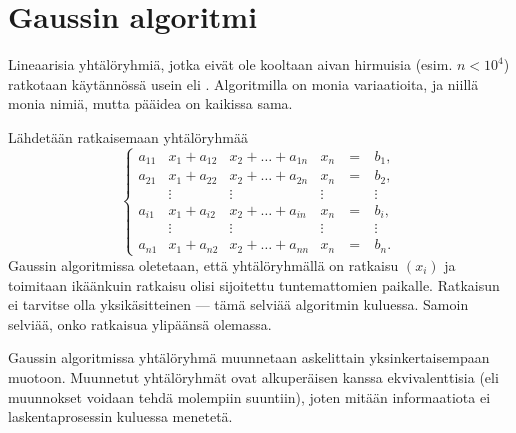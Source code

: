 \section{Gaussin algoritmi} \label{Gaussin algoritmi}
\alku
{}

Lineaarisia yhtälöryhmiä, jotka eivät ole kooltaan aivan hirmuisia (esim. $n<10^4$) ratkotaan
käytännössä usein  eli . Algoritmilla on
monia variaatioita, ja niillä monia nimiä, mutta pääidea on kaikissa sama.

Lähdetään ratkaisemaan yhtälöryhmää
\[
\left\{
\begin{alignedat}{3}
a_{11} &x_1 + a_{12} &x_2 + \ldots + a_{1n}         &x_n  \ &= \ &b_1,    \\
a_{21} &x_1 + a_{22} &x_2 + \ldots + a_{2n}         &x_n  \ &= \ &b_2,    \\
       &\vdots       & \vdots \qquad \qquad \quad \ &\vdots &    &\vdots \\
a_{i1} &x_1 + a_{i2} &x_2 + \ldots + a_{in}         &x_n  \ &= \ &b_i,    \\
       &\vdots       & \vdots \qquad \qquad \quad \ &\vdots &    &\vdots \\
a_{n1} &x_1 + a_{n2} &x_2 + \ldots + a_{nn}         &x_n  \ &= \ &b_n. \
\end{alignedat}
\right.
\]
Gaussin algoritmissa oletetaan, että yhtälöryhmällä on ratkaisu $(x_i)$ ja toimitaan ikäänkuin
ratkaisu olisi sijoitettu tuntemattomien paikalle. Ratkaisun ei tarvitse olla yksikäsitteinen
--- tämä selviää algoritmin kuluessa. Samoin selviää, onko ratkaisua ylipäänsä olemassa.

Gaussin algoritmissa yhtälöryhmä muunnetaan askelittain yksinkertaisempaan muotoon. Muunnetut
yhtälöryhmät ovat alkuperäisen kanssa ekvivalenttisia (eli muunnokset voidaan tehdä molempiin 
suuntiin), joten mitään informaatiota ei laskentaprosessin kuluessa menetetä.

